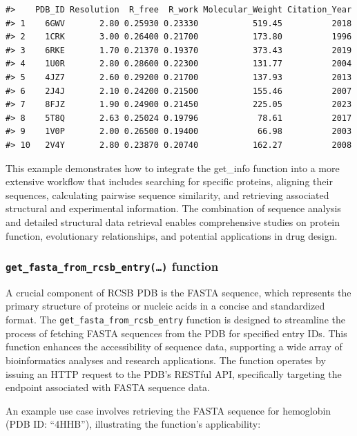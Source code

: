 \begin{verbatim}
#>    PDB_ID Resolution  R_free  R_work Molecular_Weight Citation_Year
#> 1    6GWV       2.80 0.25930 0.23330           519.45          2018
#> 2    1CRK       3.00 0.26400 0.21700           173.80          1996
#> 3    6RKE       1.70 0.21370 0.19370           373.43          2019
#> 4    1U0R       2.80 0.28600 0.22300           131.77          2004
#> 5    4JZ7       2.60 0.29200 0.21700           137.93          2013
#> 6    2J4J       2.10 0.24200 0.21500           155.46          2007
#> 7    8FJZ       1.90 0.24900 0.21450           225.05          2023
#> 8    5T8Q       2.63 0.25024 0.19796            78.61          2017
#> 9    1V0P       2.00 0.26500 0.19400            66.98          2003
#> 10   2V4Y       2.80 0.23870 0.20740           162.27          2008
\end{verbatim}

This example demonstrates how to integrate the get\_info function into a more extensive workflow that includes searching for specific proteins, aligning their sequences, calculating pairwise sequence similarity, and retrieving associated structural and experimental information. The combination of sequence analysis and detailed structural data retrieval enables comprehensive studies on protein function, evolutionary relationships, and potential applications in drug design.

\subsubsection{\texorpdfstring{\texttt{get\_fasta\_from\_rcsb\_entry(…)} function}{get\_fasta\_from\_rcsb\_entry(\ldots) function}}\label{get_fasta_from_rcsb_entry-function}

A crucial component of RCSB PDB is the FASTA sequence, which represents the primary structure of proteins or nucleic acids in a concise and standardized format. The \texttt{get\_fasta\_from\_rcsb\_entry} function is designed to streamline the process of fetching FASTA sequences from the PDB for specified entry IDs. This function enhances the accessibility of sequence data, supporting a wide array of bioinformatics analyses and research applications. The function operates by issuing an HTTP request to the PDB's RESTful API, specifically targeting the endpoint associated with FASTA sequence data.

An example use case involves retrieving the FASTA sequence for hemoglobin (PDB ID: ``4HHB''), illustrating the function's applicability:

